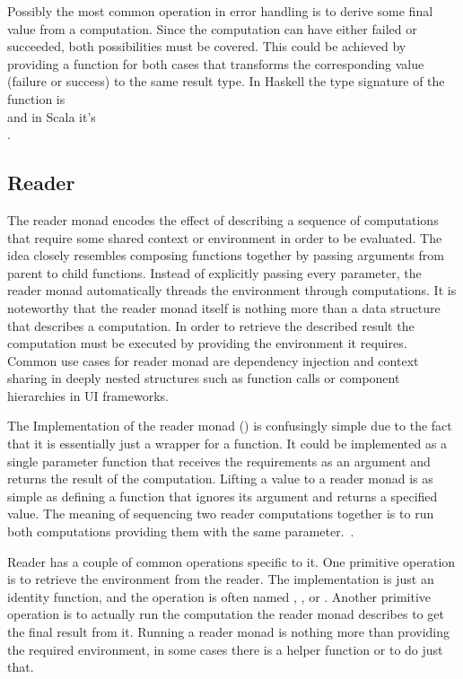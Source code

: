 Possibly the most common operation in error handling is to derive some final value from a computation. Since the computation can have either failed or succeeded, both possibilities must be covered. This could be achieved by providing a function for both cases that transforms the corresponding value (failure or success) to the same result type. In Haskell the type signature of the function is \\ and in Scala it's \\.


\subsection{Reader}
The reader monad encodes the effect of describing a sequence of computations that require some shared context or environment in order to be evaluated. The idea closely resembles composing functions together by passing arguments from parent to child functions. Instead of explicitly passing every parameter, the reader monad automatically threads the environment through computations. It is noteworthy that the reader monad itself is nothing more than a data structure that describes a computation. In order to retrieve the described result the computation must be executed by providing the environment it requires. Common use cases for reader monad are dependency injection and context sharing in deeply nested structures such as function calls or component hierarchies in UI frameworks.



The Implementation of the reader monad () is confusingly simple due to the fact that it is essentially just a wrapper for a function. It could be implemented as a single parameter function that receives the requirements as an argument and returns the result of the computation. Lifting a value to a reader monad is as simple as defining a function that ignores its argument and returns a specified value. The meaning of sequencing two reader computations together is to run both computations providing them with the same parameter.~\cite{fp-overloading-ho-polymorphism}.

Reader has a couple of common operations specific to it. One primitive operation is to retrieve the environment from the reader. The implementation is just an identity function, and the operation is often named , , or . Another primitive operation is to actually run the computation the reader monad describes to get the final result from it. Running a reader monad is nothing more than providing the required environment, in some cases there is a helper function  or  to do just that.


